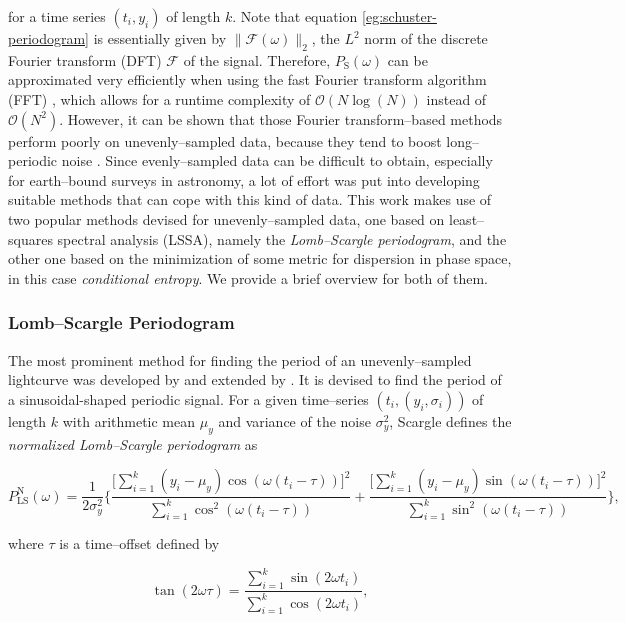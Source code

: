for a time series $(t_i, y_i)$ of length $k$. Note that equation \ref{eg:schuster-periodogram} is essentially given by $\| \mathcal{F}(\omega) \|_2 $, the $L^2$ norm of the discrete Fourier transform (DFT) $\mathcal{F}$ of the signal. Therefore, $P_{\text{S}}(\omega)$ can be approximated very efficiently when using the fast Fourier transform algorithm (FFT) \citep{cooley1965}, which allows for a runtime complexity of $\mathcal{O}(N\log{(N)})$ instead of $\mathcal{O}(N^2)$. However, it can be shown that those Fourier transform--based methods perform poorly on unevenly--sampled data, because they tend to boost long--periodic noise . Since evenly--sampled data can be difficult to obtain, especially for earth--bound surveys in astronomy, a lot of effort was put into developing suitable methods that can cope with this kind of data. This work makes use of two popular methods devised for unevenly--sampled data, one based on least--squares spectral analysis (LSSA), namely the \emph{Lomb--Scargle periodogram}, and the other one based on the minimization of some metric for dispersion in phase space, in this case \emph{conditional entropy}. We provide a brief overview for both of them.

\subsubsection{Lomb--Scargle Periodogram}

The most prominent method for finding the period of an unevenly--sampled lightcurve was developed by \citet{lomb1976} and extended by \citet{scargle1982}. It is devised to find the period of a sinusoidal-shaped periodic signal. For a given time--series $(t_i, (y_i, \sigma_i))$ of length $k$ with arithmetic mean $\mu_y$ and variance of the noise $\sigma_y^2$, Scargle defines the \emph{normalized Lomb--Scargle periodogram} as

\begin{equation}
\label{eq:normalized-lomb-scargle}
P^{\text{N}}_{\text{LS}}(\omega) = \frac{1}{2 \sigma_y^2} \Bigg\{ \frac{\big[\sum\limits_{i=1}^k (y_i - \mu_y) \cos(\omega(t_i - \tau))\big]^2}{\sum\limits_{i=1}^k \cos^2(\omega(t_i - \tau))} + \frac{\big[\sum\limits_{i=1}^k (y_i - \mu_y) \sin(\omega(t_i - \tau))\big]^2}{\sum\limits_{i=1}^k \sin^2(\omega(t_i - \tau))}\Bigg\},
\end{equation}

where $\tau$ is a time--offset defined by

\begin{equation}
\tan(2 \omega \tau) = \frac{\sum\limits_{i=1}^k \sin(2 \omega t_i)}{\sum\limits_{i=1}^k \cos(2 \omega t_i)},
\end{equation}

